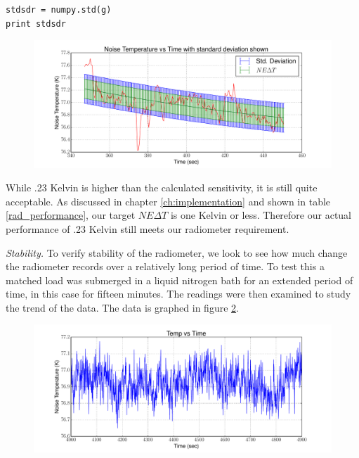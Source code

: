 {\begin{lstlisting}[frame=single,keywordstyle=\color{blue}]
stdsdr = numpy.std(g)
print stdsdr
\end{lstlisting}

\begin{figure}[h!tb] \centering
\includegraphics[width=\textwidth]{Experiments/Exp1/std_dev_errbar.pdf}
\label{sensitivity_exp_real}
\end{figure}

While .23 Kelvin is higher than the calculated sensitivity, it is still quite acceptable.  As discussed in chapter \ref{ch:implementation} and shown in table \ref{rad_performance}, our target $NE\Delta T$ is one Kelvin or less.  Therefore our actual performance of .23 Kelvin still meets our radiometer requirement.

\emph{Stability.}  To verify stability of the radiometer, we look to see how much change the radiometer records over a relatively long period of time.  To test this a matched load was submerged in a liquid nitrogen bath for an extended period of time, in this case for fifteen minutes.  The readings were then examined to study the trend of the data.  The data is graphed in figure \ref{Stability}.

\begin{figure}[h!tb] \centering
\includegraphics[width=\textwidth]{Experiments/Exp2/sdr_calibrated_zoom.pdf}
\label{Stability}
\end{figure}

}
